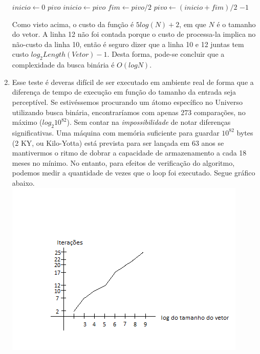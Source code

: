 \documentclass[11pt]{article}
\begin{document}
\begin{enumerate}
\begin{algorithmic}[1]
                \State $inicio \gets 0$ 
                 
                     
                        \State \Return $pivo$ 
                    \EndIf
                     
                        \State $inicio \gets pivo$
                    \Else
                        \State $fim \gets pivo/2$
                    \EndIf
                    \State $pivo \gets (inicio+fim)/2$ 
                \EndWhile
                \State \Return $-1$ 
            \EndFunction
        \end{algorithmic}
        Como visto acima, o custo da função é $5log(N)+2$, em que $N$ é o
tamanho do vetor. A linha 12 não foi contada porque o custo de processa-la
implica no não-custo da linha 10, então é seguro dizer que a linha 10 e 12
juntas tem custo $log_2 Length(Vetor) -1$. Desta forma, pode-se concluir que a
complexidade da busca binária é $O(logN)$.
        \item Esse teste é deveras difícil de ser executado em ambiente real de
forma que a diferença de tempo de execução em função do tamanho da entrada seja
perceptível. Se estivéssemos procurando um átomo específico no Universo
utilizando busca binária, encontraríamos com apenas 273 comparações, no máximo
($log_2 10^{82}$). Sem contar na \textit{impossibilidade} de notar diferenças
significativas. Uma máquina com memória suficiente para guardar $10^{82}$ bytes
(2 KY, ou Kilo-Yotta) está prevista para ser lançada em 63 anos se mantivermos
o ritmo de dobrar a capacidade de armazenamento a cada 18 meses no mínimo. No
entanto, para efeitos de verificação do algoritmo, podemos medir a quantidade
de vezes que o loop foi executado. Segue gráfico abaixo. \\
        \includegraphics{plot-log.png} \\

\end{enumerate}
\end{document}
